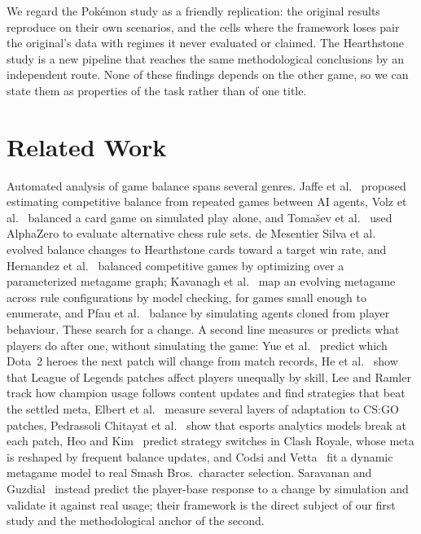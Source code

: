 \documentclass[journal]{IEEEtran}
\newcommand{\pkmn}{Pok\'emon}
\begin{document}
We regard the \pkmn{} study as a friendly replication: the original
results reproduce on their own scenarios, and the cells where the
framework loses pair the original's data with regimes it never evaluated
or claimed. The Hearthstone study is a new pipeline that reaches
the same methodological conclusions by an independent route. None of these findings depends on the other game, so we can state them as properties of the task rather than of one title.

\section{Related Work}

Automated analysis of game balance spans several genres. Jaffe et
al.~\cite{jaffe2012evaluating} proposed estimating competitive balance
from repeated games between AI agents, Volz et al.~\cite{volz2016demonstrating}
balanced a card game on simulated play alone, and Toma\v{s}ev et
al.~\cite{tomasev2020assessing} used AlphaZero to evaluate alternative
chess rule sets. de Mesentier Silva et al.~\cite{silva2019evolving}
evolved balance changes to Hearthstone cards toward a target win rate,
and Hernandez et al.~\cite{hernandez2020metagame} balanced competitive
games by optimizing over a parameterized metagame graph; Kavanagh et
al.~\cite{kavanagh2021chained} map an evolving metagame across rule
configurations by model checking, for games small enough to enumerate,
and Pfau et al.~\cite{pfau2023replicants} balance by simulating agents
cloned from player behaviour. These search for a change. A second line
measures or predicts what players do after one, without simulating the
game: Yue et al.~\cite{yue2022gospel} predict which Dota~2 heroes the
next patch will change from match records, He et
al.~\cite{he2021heterogeneous} show that League of Legends patches affect
players unequally by skill, Lee and Ramler~\cite{lee2015champion,lee2017nonmeta}
track how champion usage follows content updates and find strategies that
beat the settled meta, Elbert et al.~\cite{elbert2023layers} measure
several layers of adaptation to CS:GO patches, Pedrassoli Chitayat et
al.~\cite{chitayat2023beyond} show that esports analytics models break at
each patch, Heo and Kim~\cite{heo2026switch} predict strategy switches in
Clash Royale, whose meta is reshaped by frequent balance updates, and Codsi
and Vetta~\cite{codsi2021metagames} fit a dynamic metagame model to real
Smash Bros.\ character selection. Saravanan and
Guzdial~\cite{saravanan2024framework} instead predict the player-base
response to a change by simulation and validate it against real usage;
their framework is the direct subject of our first study and the
methodological anchor of the second.
\end{document}

